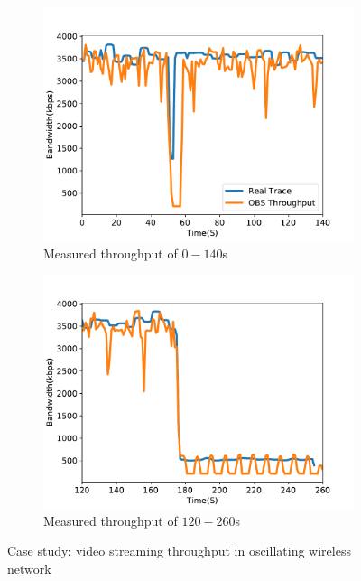 
\begin{figure}[htb]
\centering
\begin{subfigure}[b]{.45\columnwidth}
\centering
\includegraphics[width=\textwidth]{fig/case_study_throughput_a.pdf}
\caption{Measured throughput of $0-140$s}
\label{fig:case-throughput-a} 
\end{subfigure}
\begin{subfigure}[b]{.45\columnwidth}
\centering
\includegraphics[width=\textwidth]{fig/case_study_throughput_b.pdf}
\caption{Measured throughput of $120-260$s}
\label{fig:case-throughput-b} 
\end{subfigure}
\caption{Case study: video streaming throughput in oscillating wireless network}
\label{fig:case-throughput} 
\end{figure} 